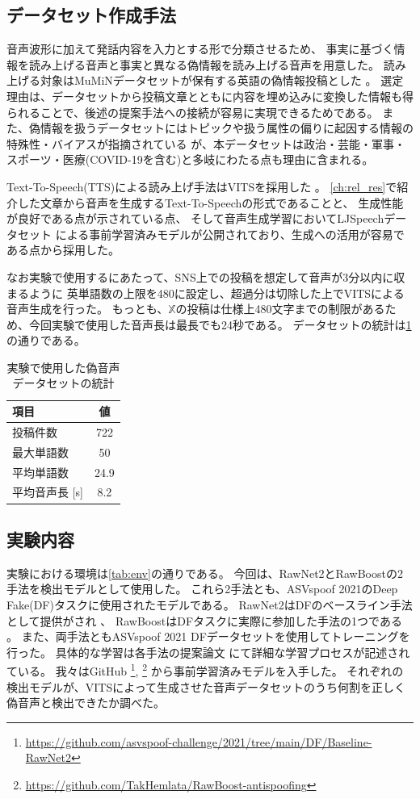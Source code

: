 \subsection{データセット作成手法}\label{ssc:spc_ds}
音声波形に加えて発話内容を入力とする形で分類させるため、
事実に基づく情報を読み上げる音声と事実と異なる偽情報を読み上げる音声を用意した。
読み上げる対象はMuMiNデータセットが保有する英語の偽情報投稿とした \cite{10.1145/3477495.3531744}。
選定理由は、データセットから投稿文章とともに内容を埋め込みに変換した情報も得られることで、後述の提案手法への接続が容易に実現できるためである。
また、偽情報を扱うデータセットにはトピックや扱う属性の偏りに起因する情報の特殊性・バイアスが指摘されている \cite{10.1145/3477495.3531816}が、本データセットは政治・芸能・軍事・スポーツ・医療(COVID-19を含む)と多岐にわたる点も理由に含まれる。

Text-To-Speech(TTS)による読み上げ手法はVITSを採用した \cite{pmlr-v139-kim21f}。
\cref{ch:rel_res}で紹介した文章から音声を生成するText-To-Speechの形式であることと、
生成性能が良好である点が示されている点、
そして音声生成学習においてLJSpeechデータセット \cite{ljspeech17}による事前学習済みモデルが公開されており、生成への活用が容易である点から採用した。

なお実験で使用するにあたって、SNS上での投稿を想定して音声が3分以内に収まるように
英単語数の上限を480に設定し、超過分は切除した上でVITSによる音声生成を行った。
もっとも、$\mathbb{X}$の投稿は仕様上480文字までの制限があるため、今回実験で使用した音声長は最長でも24秒である。
データセットの統計は\cref{tb:dataset}の通りである。

\begin{table}[h]
    \centering
    \caption{実験で使用した偽音声データセットの統計}
    \begin{tabular}{lc}\hline
        項目 & 値\\\hline\hline
        投稿件数 & 722\\
        最大単語数 & 50\\
        平均単語数 & 24.9\\
        平均音声長 [\si{s}] & 8.2\\\hline
    \end{tabular}
    \label{tb:dataset}
\end{table}

\subsection{実験内容}
実験における環境は\ref{tab:env}の通りである。
今回は、RawNet2とRawBoostの2手法を検出モデルとして使用した。
これら2手法とも、ASVspoof 2021のDeep Fake(DF)タスクに使用されたモデルである。
RawNet2はDFのベースライン手法として提供がされ \cite{yamagishi21_asvspoof}、
RawBoostはDFタスクに実際に参加した手法の1つである \cite{9746213}。
また、両手法ともASVspoof 2021 DFデータセットを使用してトレーニングを行った。
具体的な学習は各手法の提案論文 \cite{9414234,9746213}にて詳細な学習プロセスが記述されている。
我々はGitHub \footnote{\url{https://github.com/asvspoof-challenge/2021/tree/main/DF/Baseline-RawNet2}}, 
\footnote{\url{https://github.com/TakHemlata/RawBoost-antispoofing}}
から事前学習済みモデルを入手した。
それぞれの検出モデルが、VITSによって生成させた音声データセットのうち何割を正しく偽音声と検出できたか調べた。

